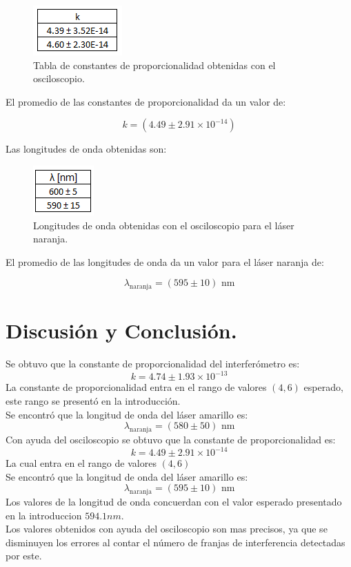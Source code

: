\documentclass[DIV=calc, paper=a4, fontsize=10.5pt]{scrartcl}
\begin{document}
\begin{figure}[H]
    \centering
    \includegraphics{tablas/tabla 3.PNG}
    \caption{Tabla de constantes de proporcionalidad obtenidas con el osciloscopio.}
    \label{fig:my_label}
\end{figure}

El promedio de las constantes de proporcionalidad  da un valor de:

\begin{equation*}
    k = (4.49 \pm 2.91\times 10^{-14})
\end{equation*}

Las longitudes de onda obtenidas son:

\begin{figure}[H]
    \centering
    \includegraphics{tablas/tabla 4.PNG}
    \caption{Longitudes de onda obtenidas con el osciloscopio para el láser naranja.}
    \label{fig:my_label}
\end{figure}

El promedio de las longitudes de onda da un valor para el láser naranja de:

\begin{equation*}
    \lambda_{\text{naranja}} = (595 \pm 10) \text{ nm}
\end{equation*}



\section*{\textcolor{carmine}{Discusión y Conclusión.}}

Se obtuvo que la constante de proporcionalidad del interferómetro es: 
$$k = 4.74 \pm 1.93\times 10^{-13}$$
La constante de proporcionalidad entra en el rango de valores $(4,6)$ esperado, este rango se presentó en la introducción.
\\
Se encontró que la longitud de onda del láser amarillo es:
$$\lambda_{\text{naranja}} = (580 \pm 50) \text{ nm}$$
Con ayuda del osciloscopio se obtuvo que la constante de proporcionalidad es:
$$k= 4.49 \pm 2.91 \times 10^{-14}$$ 
La cual entra en el rango de valores $(4,6)$
\\
Se encontró que la longitud de onda del láser amarillo es:
$$\lambda_{\text{naranja}} = (595 \pm 10) \text{ nm}$$
Los valores de la longitud de onda concuerdan con el valor esperado presentado en la introduccion $594.1 nm$.
\\
Los valores obtenidos con ayuda del osciloscopio son mas precisos, ya que se disminuyen los errores al contar el número de franjas de interferencia detectadas por este.
\nocite{*}


\end{document}
